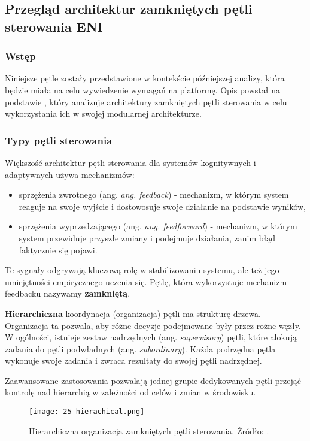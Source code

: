 \subsection{Przegląd architektur zamkniętych pętli sterowania ENI}\hypertarget{sec:25}{}

\subsubsection{Wstęp}

Niniejsze pętle zostały przedstawione w kontekście późniejszej analizy, która będzie miała na celu wywiedzenie wymagań na platformę. Opis powstał na podstawie \cite{etsieni2024}, który analizuje architektury zamkniętych pętli sterowania w celu wykorzystania ich w swojej modularnej architekturze. 
\subsubsection{Typy pętli sterowania}

Większość architektur pętli sterowania dla systemów kognitywnych i adaptywnych używa mechanizmów:
\begin{itemize}
    \item sprzężenia zwrotnego (ang. \textit{ang. feedback}) - mechanizm, w którym system reaguje na swoje wyjście i dostowosuje swoje działanie na podstawie wyników,
    \item sprzężenia wyprzedzającego (ang. \textit{ang. feedforward}) - mechanizm, w którym system przewiduje przyszłe zmiany i podejmuje działania, zanim błąd faktycznie się pojawi.
\end{itemize}

Te sygnały odgrywają kluczową rolę w stabilizowaniu systemu, ale też jego umiejętności empirycznego uczenia się. Pętlę, która wykorzystuje mechanizm feedbacku nazywamy \textbf{zamkniętą}.

\textbf{Hierarchiczna} koordynacja (organizacja) pętli ma strukturę drzewa. Organizacja ta pozwala, aby różne decyzje podejmowane były przez rożne węzły. W ogólności, istnieje zestaw nadrzędnych (ang. \textit{supervisory}) pętli, które alokują zadania do pętli podwładnych (ang. \textit{subordinary}). Każda podrzędna pętla wykonuje swoje zadania i zwraca rezultaty do swojej pętli nadrzędnej. 

Zaawansowane zastosowania pozwalają jednej grupie dedykowanych pętli przejąć kontrolę nad hierarchią w zależności od celów i zmian w środowisku. 


\begin{figure}[!h]
    \centering \texttt{[image: 25-hierachical.png]}
    \caption{Hierarchiczna organizacja zamkniętych pętli sterowania. Źródło: \cite{etsieni2024}.}\label{fig:25-hierachical}
\end{figure}

